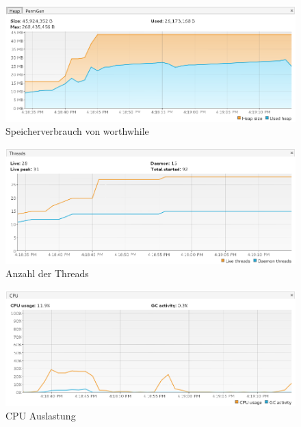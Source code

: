 \begin{center}
	\begin{figure}
		\includegraphics[width=13cm]{images/worthwhile-ressourcen-heap.png}
		\caption{Speicherverbrauch von worthwhile}
 		\label{heapsize}
	\end{figure}
\end{center}

\begin{center}
	\begin{figure}[h]
		\includegraphics[width=13cm]{images/worthwhile-ressourcen-threads.png}
		\caption{Anzahl der Threads}
 		\label{threadcount}
	\end{figure}
\end{center}

\begin{center}
	\begin{figure}[h]
		\includegraphics[width=13cm]{images/worthwhile-ressourcen-cpu.png}
		\caption{CPU Auslastung}
 		\label{cpuusage}
	\end{figure}
\end{center}
